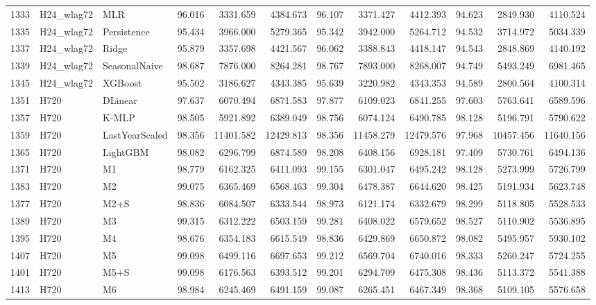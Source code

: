 \begin{tabular}{lllrrrrrrrrr}
1333 & H24_wlag72 & MLR & 96.016 & 3331.659 & 4384.673 & 96.107 & 3371.427 & 4412.393 & 94.623 & 2849.930 & 4110.524 \\
1335 & H24_wlag72 & Persistence & 95.434 & 3966.000 & 5279.365 & 95.342 & 3942.000 & 5264.712 & 94.532 & 3714.972 & 5034.339 \\
1337 & H24_wlag72 & Ridge & 95.879 & 3357.698 & 4421.567 & 96.062 & 3388.843 & 4418.147 & 94.543 & 2848.869 & 4140.192 \\
1339 & H24_wlag72 & SeasonalNaive & 98.687 & 7876.000 & 8264.281 & 98.767 & 7893.000 & 8268.007 & 94.749 & 5493.249 & 6981.465 \\
1345 & H24_wlag72 & XGBoost & 95.502 & 3186.627 & 4343.385 & 95.639 & 3220.982 & 4343.353 & 94.589 & 2800.564 & 4100.314 \\
1351 & H720 & DLinear & 97.637 & 6070.494 & 6871.583 & 97.877 & 6109.023 & 6841.255 & 97.603 & 5763.641 & 6589.596 \\
1357 & H720 & K-MLP & 98.505 & 5921.892 & 6389.049 & 98.756 & 6074.124 & 6490.785 & 98.128 & 5196.791 & 5790.622 \\
1359 & H720 & LastYearScaled & 98.356 & 11401.582 & 12429.813 & 98.356 & 11458.279 & 12479.576 & 97.968 & 10457.456 & 11640.156 \\
1365 & H720 & LightGBM & 98.082 & 6296.799 & 6874.589 & 98.208 & 6408.156 & 6928.181 & 97.409 & 5730.761 & 6494.136 \\
1371 & H720 & M1 & 98.779 & 6162.325 & 6411.093 & 99.155 & 6301.047 & 6495.242 & 98.128 & 5273.999 & 5726.799 \\
1383 & H720 & M2 & 99.075 & 6365.469 & 6568.463 & 99.304 & 6478.387 & 6644.620 & 98.425 & 5191.934 & 5623.748 \\
1377 & H720 & M2+S & 98.836 & 6084.507 & 6333.544 & 98.973 & 6121.174 & 6332.679 & 98.299 & 5118.805 & 5528.533 \\
1389 & H720 & M3 & 99.315 & 6312.222 & 6503.159 & 99.281 & 6408.022 & 6579.652 & 98.527 & 5110.902 & 5536.895 \\
1395 & H720 & M4 & 98.676 & 6354.183 & 6615.549 & 98.836 & 6429.869 & 6650.872 & 98.082 & 5495.957 & 5930.102 \\
1407 & H720 & M5 & 99.098 & 6499.116 & 6697.653 & 99.212 & 6569.704 & 6740.016 & 98.333 & 5260.247 & 5724.255 \\
1401 & H720 & M5+S & 99.098 & 6176.563 & 6393.512 & 99.201 & 6294.709 & 6475.308 & 98.436 & 5113.372 & 5541.388 \\
1413 & H720 & M6 & 98.984 & 6245.469 & 6491.159 & 99.087 & 6265.451 & 6467.349 & 98.368 & 5109.105 & 5576.658 \\

\end{tabular}
